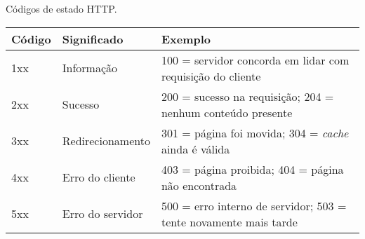 \begin{quadro}[!htb]
	\centering
	\caption{Códigos de estado HTTP.\label{qua:estadoshttp}}
	\begin{tabularx}{\textwidth}{| X | X | X |}
		\hline
		\textbf{Código} & \textbf{Significado} & \textbf{Exemplo}                            \\
		\hline
		1xx             & Informação           & 100 = servidor concorda em lidar com requisição do cliente       \\
		\hline
		2xx             & Sucesso              & 200 = sucesso na requisição; 204 = nenhum conteúdo presente      \\
		\hline
		3xx             & Redirecionamento     & 301 = página foi movida; 304 = \textit{cache} ainda é válida       \\
		\hline
		4xx             & Erro do cliente      & 403 = página proibida; 404 = página não encontrada               \\
		\hline
		5xx             & Erro do servidor     & 500 = erro interno de servidor; 503 = tente novamente mais tarde \\
		\hline
	\end{tabularx}
\end{quadro}